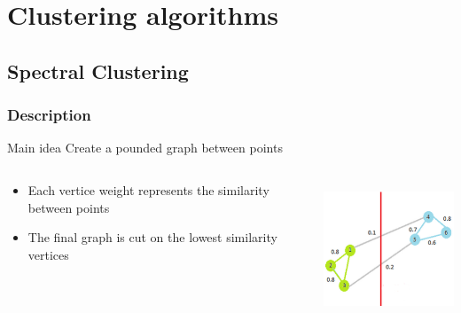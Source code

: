 \documentclass[10p]{beamer}
\begin{document}
\section{Clustering algorithms}
\subsection{Spectral Clustering}
\begin{frame}
\frametitle{Description}
\begin{block}{Main idea}
Create a pounded graph between points
\end{block}
\vfill
\begin{columns}
\begin{column}{0.6\textwidth}
\begin{itemize}
\item Each vertice weight represents the similarity between points
\item The final graph is cut on the lowest similarity vertices
\end{itemize}
\end{column}
\begin{column}{0.4\textwidth}
\includegraphics[width=\columnwidth, height=4cm]{Image/graph.png}
\end{column}
\end{columns}
\end{frame}
\end{document}
